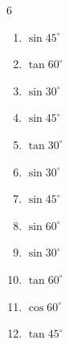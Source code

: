 \begin{multicols}{6}
\begin{enumerate}

  \item $\displaystyle \sin{45^\circ}$


  \item $\displaystyle \tan{60^\circ}$


  \item $\displaystyle \sin{30^\circ}$


  \item $\displaystyle \sin{45^\circ}$


  \item $\displaystyle \tan{30^\circ}$


  \item $\displaystyle \sin{30^\circ}$


  \item $\displaystyle \sin{45^\circ}$


  \item $\displaystyle \sin{60^\circ}$


  \item $\displaystyle \sin{30^\circ}$


  \item $\displaystyle \tan{60^\circ}$


\columnbreak %

  \item $\displaystyle \cos{60^\circ}$


  \item $\displaystyle \tan{45^\circ}$

        \phantom{$\displaystyle =1$}


\end{enumerate}
\end{multicols}
